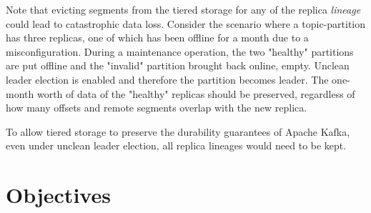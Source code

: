 \documentclass{article}
\begin{document}
Note that evicting segments from the tiered storage for any of the replica \textit{lineage} could lead to catastrophic data loss. Consider the scenario where a topic-partition has three replicas, one of which has been offline for a month due to a misconfiguration. During a maintenance operation, the two "healthy" partitions are put offline and the "invalid" partition brought back online, empty. Unclean leader election is enabled and therefore the partition becomes leader. The one-month worth of data of the "healthy" replicas should be preserved, regardless of how many offsets and remote segments overlap with the new replica.

To allow tiered storage to preserve the durability guarantees of Apache Kafka, even under unclean leader election, all replica lineages would need to be kept.

\section{Objectives}
\end{document}
